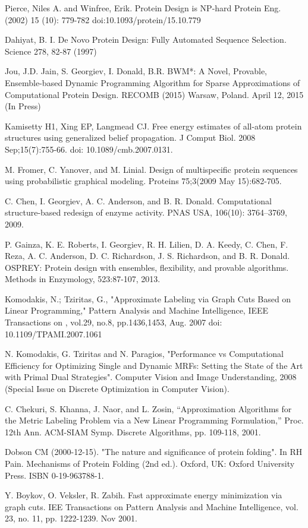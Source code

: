 \documentclass[11pt]{article}
\begin{document}
	\begin{thebibliography}{99}
	
	 Pierce, Niles A. and Winfree, Erik. Protein Design is NP-hard 
	Protein Eng. (2002) 15 (10): 779-782 doi:10.1093/protein/15.10.779
	
	 Dahiyat, B. I. De Novo Protein Design: Fully Automated Sequence
	Selection. Science 278, 82-87 (1997)	

	 Jou, J.D. Jain, S. Georgiev, I. Donald, B.R. BWM*: A Novel,
	Provable, Ensemble-based Dynamic Programming Algorithm for Sparse 
	Approximations of Computational Protein Design. RECOMB (2015) Warsaw, Poland.
	April 12, 2015 (In Press)

	 Kamisetty H1, Xing EP, Langmead CJ. Free energy estimates of
	all-atom protein structures using generalized belief propagation. J Comput
	Biol. 2008 Sep;15(7):755-66. doi: 10.1089/cmb.2007.0131.
		
	 M. Fromer, C. Yanover, and M. Linial. Design of multispecific
	protein sequences using probabilistic graphical modeling. Proteins 75;3(2009
	May 15):682-705.
	
	 C. Chen, I. Georgiev, A. C. Anderson, and B. R. Donald. 
	Computational structure-based redesign of enzyme activity. PNAS USA, 106(10):
	3764–3769, 2009.

	 P. Gainza, K. E. Roberts, I. Georgiev, R. H. Lilien, D. A. Keedy,
	C. Chen, F. Reza, A. C. Anderson, D. C. Richardson, J. S. Richardson, and B. R.
	Donald. OSPREY: Protein design with ensembles, flexibility, and provable
	algorithms. Methods in Enzymology, 523:87-107, 2013.
	
	 Komodakis, N.; Tziritas, G., "Approximate Labeling
	via Graph Cuts Based on Linear Programming," Pattern Analysis and Machine
	Intelligence, IEEE Transactions on , vol.29, no.8, pp.1436,1453, Aug. 2007
	doi: 10.1109/TPAMI.2007.1061	
	
	 N. Komodakis, G. Tziritas and N. Paragios, "Performance vs
	Computational Efficiency for Optimizing Single and Dynamic MRFs: Setting the 
	State of the Art with Primal Dual Strategies". Computer Vision and Image
	Understanding, 2008 (Special Issue on Discrete Optimization in Computer Vision).
	
	 C. Chekuri, S. Khanna, J. Naor, and L. Zosin, “Approximation
	Algorithms for the Metric Labeling Problem via a New Linear Programming
	Formulation,” Proc. 12th Ann. ACM-SIAM Symp. Discrete Algorithms, pp. 109-118,
	2001.
	
	 Dobson CM (2000-12-15). "The nature and significance of protein
	folding". In RH Pain. Mechanisms of Protein Folding (2nd ed.). Oxford, UK: Oxford
	University Press. ISBN 0-19-963788-1.	
	
	 Y. Boykov, O. Veksler, R. Zabih. Fast approximate energy
	minimization via graph cuts. IEE Transactions on Pattern Analysis and Machine
	Intelligence, vol. 23, no. 11, pp. 1222-1239. Nov 2001. 
		
	\end{thebibliography}
\end{document}
